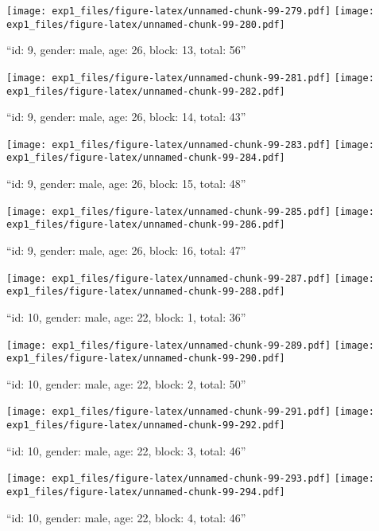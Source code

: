 \documentclass[,]{article}
\begin{document}
\texttt{[image: exp1\_files/figure-latex/unnamed-chunk-99-279.pdf]}
\texttt{[image: exp1\_files/figure-latex/unnamed-chunk-99-280.pdf]}

\newpage
[1] 

``id: 9, gender: male, age: 26, block: 13, total: 56''

\texttt{[image: exp1\_files/figure-latex/unnamed-chunk-99-281.pdf]}
\texttt{[image: exp1\_files/figure-latex/unnamed-chunk-99-282.pdf]}

\newpage
[1] 

``id: 9, gender: male, age: 26, block: 14, total: 43''

\texttt{[image: exp1\_files/figure-latex/unnamed-chunk-99-283.pdf]}
\texttt{[image: exp1\_files/figure-latex/unnamed-chunk-99-284.pdf]}

\newpage
[1] 

``id: 9, gender: male, age: 26, block: 15, total: 48''

\texttt{[image: exp1\_files/figure-latex/unnamed-chunk-99-285.pdf]}
\texttt{[image: exp1\_files/figure-latex/unnamed-chunk-99-286.pdf]}

\newpage
[1] 

``id: 9, gender: male, age: 26, block: 16, total: 47''

\texttt{[image: exp1\_files/figure-latex/unnamed-chunk-99-287.pdf]}
\texttt{[image: exp1\_files/figure-latex/unnamed-chunk-99-288.pdf]}

\newpage
[1] 

``id: 10, gender: male, age: 22, block: 1, total: 36''

\texttt{[image: exp1\_files/figure-latex/unnamed-chunk-99-289.pdf]}
\texttt{[image: exp1\_files/figure-latex/unnamed-chunk-99-290.pdf]}

\newpage
[1] 

``id: 10, gender: male, age: 22, block: 2, total: 50''

\texttt{[image: exp1\_files/figure-latex/unnamed-chunk-99-291.pdf]}
\texttt{[image: exp1\_files/figure-latex/unnamed-chunk-99-292.pdf]}

\newpage
[1] 

``id: 10, gender: male, age: 22, block: 3, total: 46''

\texttt{[image: exp1\_files/figure-latex/unnamed-chunk-99-293.pdf]}
\texttt{[image: exp1\_files/figure-latex/unnamed-chunk-99-294.pdf]}

\newpage
[1] 

``id: 10, gender: male, age: 22, block: 4, total: 46''
\end{document}
